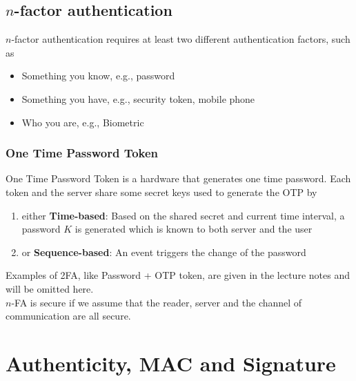 \documentclass[12pt]{article}
\theoremstyle{definition}
\begin{document}
\subsection{$n$-factor authentication}
$n$-factor authentication requires at least two different authentication factors, such as
\begin{itemize}
  \item Something you know, e.g., password
  \item Something you have, e.g., security token, mobile phone
  \item Who you are, e.g., Biometric
\end{itemize}
\subsubsection{One Time Password Token}
One Time Password Token is a hardware that generates one time password. Each token and the server share some secret keys used to generate the OTP by
\begin{enumerate}
  \item either \textbf{Time-based}: Based on the shared secret and current time interval, a password $K$ is generated which is known to both server and the user
  \item or \textbf{Sequence-based}: An event triggers the change of the password
\end{enumerate}
Examples of 2FA, like Password + OTP token, are given in the lecture notes and will be omitted here. \\
$n$-FA is secure if we assume that the reader, server and the channel of communication are all secure.
\clearpage
\section{Authenticity, MAC and Signature}
\end{document}
